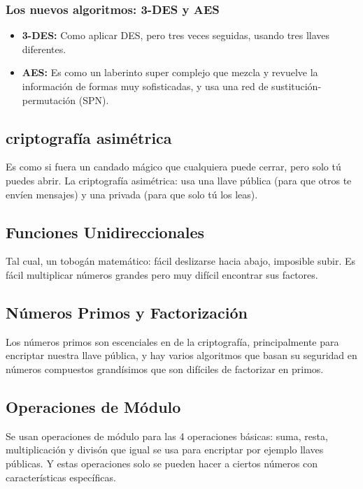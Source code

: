 \documentclass{article}
\begin{document}
        \subsubsection{Los nuevos algoritmos: 3-DES y AES}
            \begin{itemize}
                \item \textbf{3-DES:} Como aplicar DES, pero tres veces seguidas, usando tres llaves 
                diferentes.
                \item \textbf{AES:} Es como un laberinto super complejo que mezcla y revuelve la información 
                de formas muy sofisticadas, y usa una red de sustitución-permutación (SPN).
            \end{itemize}

    \subsection{criptografía asimétrica}
        Es como si fuera un candado mágico que cualquiera puede cerrar, pero solo tú puedes abrir. 
        La criptografía asimétrica: usa una llave pública (para que otros te 
        envíen mensajes) y una privada (para que solo tú los leas).
    
    \subsection{Funciones Unidireccionales}
        Tal cual, un tobogán matemático: fácil deslizarse hacia abajo, imposible subir. 
        Es fácil multiplicar números grandes pero muy difícil encontrar sus factores.

    \subsection{Números Primos y Factorización}
        Los números primos son escenciales en de la criptografía, principalmente para encriptar
        nuestra llave pública, y hay varios algoritmos que basan su seguridad en números compuestos
        grandísimos que son difíciles de factorizar en primos.

    \subsection{Operaciones de Módulo}
        Se usan operaciones de módulo para las 4 operaciones básicas: suma, resta, multiplicación 
        y divisón que igual se usa para encriptar por ejemplo llaves públicas. Y estas operaciones
        solo se pueden hacer a ciertos números con características específicas.
\end{document}
